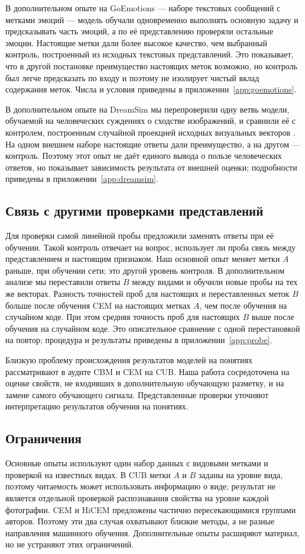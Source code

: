 \documentclass[10pt]{article}
\begin{document}
В дополнительном опыте на GoEmotions --- наборе текстовых сообщений с метками эмоций \citep{goemotions} --- модель обучали одновременно выполнять основную задачу и предсказывать часть эмоций, а по её представлению проверяли остальные эмоции. Настоящие метки дали более высокое качество, чем выбранный контроль, построенный из исходных текстовых представлений. Это показывает, что в другой постановке преимущество настоящих меток возможно, но контроль был легче предсказать по входу и поэтому не изолирует чистый вклад содержания меток. Числа и условия приведены в приложении~\ref{app:goemotions}.

В дополнительном опыте на DreamSim мы перепроверили одну ветвь модели, обучаемой на человеческих суждениях о сходстве изображений, и сравнили её с контролем, построенным случайной проекцией исходных визуальных векторов \citep{dreamsim}. На одном внешнем наборе настоящие ответы дали преимущество, а на другом --- контроль. Поэтому этот опыт не даёт единого вывода о пользе человеческих ответов, но показывает зависимость результата от внешней оценки; подробности приведены в приложении~\ref{app:dreamsim}.

\subsection{Связь с другими проверками представлений}
Для проверки самой линейной пробы \citet{hewitt} предложили заменять ответы при её обучении. Такой контроль отвечает на вопрос, использует ли проба связь между представлением и настоящим признаком. Наш основной опыт меняет метки $A$ раньше, при обучении сети; это другой уровень контроля. В дополнительном анализе мы переставили ответы $B$ между видами и обучили новые пробы на тех же векторах. Разность точностей проб для настоящих и переставленных меток $B$ больше после обучения CEM на настоящих метках $A$, чем после обучения на случайном коде. При этом средняя точность проб для настоящих $B$ выше после обучения на случайном коде. Это описательное сравнение с одной перестановкой на повтор; процедура и результаты приведены в приложении~\ref{app:probe}.

Близкую проблему происхождения результатов моделей на понятиях рассматривают \citet{audit} в аудите CBM и CEM на CUB. Наша работа сосредоточена на оценке свойств, не входивших в дополнительную обучающую разметку, и на замене самого обучающего сигнала. Представленные проверки уточняют интерпретацию результатов обучения на понятиях.

\subsection{Ограничения}
Основные опыты используют один набор данных с видовыми метками и проверкой на известных видах. В CUB метки $A$ и $B$ заданы на уровне вида, поэтому читаемость может использовать информацию о виде; результат не является отдельной проверкой распознавания свойства на уровне каждой фотографии. CEM и HiCEM предложены частично пересекающимися группами авторов. Поэтому эти два случая охватывают близкие методы, а не разные направления машинного обучения. Дополнительные опыты расширяют материал, но не устраняют этих ограничений.
\end{document}
